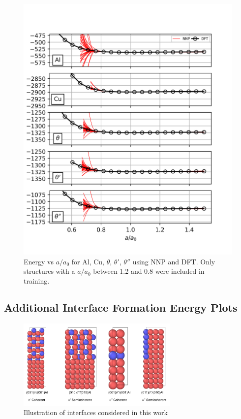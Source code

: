 \documentclass{article}
\begin{document}
\begin{figure}[H]%
\centering%
\includegraphics[width=1.0\textwidth,center]{figures/EOS_all.png}%
\caption{Energy vs $a/a_0$ for Al, Cu, $\theta$, $\theta'$, $\theta''$ using NNP and DFT. Only structures with a $a/a_0$ between 1.2 and 0.8 were included in training.}%
\end{figure}


\subsection{Additional Interface Formation Energy Plots} \label{apd_sct:add_interface}

\begin{figure}[H]%
\centering%
\includegraphics[width=0.7\textwidth,center]{figures/InterfacePlot-Daniel-2020.04.17.png}%
\caption{Illustration of interfaces considered in this work}%
\label{fig:interface_structures}
\end{figure}
\end{document}
